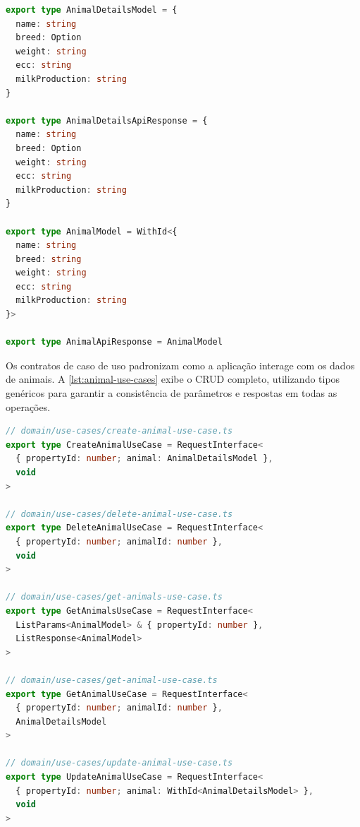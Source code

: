 \begin{center}
\end{center}
\vspace{-1.5\baselineskip}
\begin{lstlisting}[language=TypeScript]
export type AnimalDetailsModel = {
  name: string
  breed: Option
  weight: string
  ecc: string
  milkProduction: string
}

export type AnimalDetailsApiResponse = {
  name: string
  breed: Option
  weight: string
  ecc: string
  milkProduction: string
}

export type AnimalModel = WithId<{
  name: string
  breed: string
  weight: string
  ecc: string
  milkProduction: string
}>

export type AnimalApiResponse = AnimalModel
\end{lstlisting}
\vspace{-0.5\baselineskip}
\begin{center}
\begingroup{}\fonte{}\endgroup
\end{center}

Os contratos de caso de uso padronizam como a aplicação interage com os dados de animais. A \autoref{lst:animal-use-cases} exibe o \gls{CRUD} completo, utilizando tipos genéricos para garantir a consistência de parâmetros e respostas em todas as operações.

\begin{center}
\end{center}
\vspace{-1.5\baselineskip}
\begin{lstlisting}[language=TypeScript]
// domain/use-cases/create-animal-use-case.ts
export type CreateAnimalUseCase = RequestInterface<
  { propertyId: number; animal: AnimalDetailsModel },
  void
>

// domain/use-cases/delete-animal-use-case.ts
export type DeleteAnimalUseCase = RequestInterface<
  { propertyId: number; animalId: number },
  void
>

// domain/use-cases/get-animals-use-case.ts
export type GetAnimalsUseCase = RequestInterface<
  ListParams<AnimalModel> & { propertyId: number },
  ListResponse<AnimalModel>
>

// domain/use-cases/get-animal-use-case.ts
export type GetAnimalUseCase = RequestInterface<
  { propertyId: number; animalId: number },
  AnimalDetailsModel
>

// domain/use-cases/update-animal-use-case.ts
export type UpdateAnimalUseCase = RequestInterface<
  { propertyId: number; animal: WithId<AnimalDetailsModel> },
  void
>
\end{lstlisting}
\vspace{-0.5\baselineskip}
\begin{center}
\begingroup{}\fonte{}\endgroup
\end{center}

